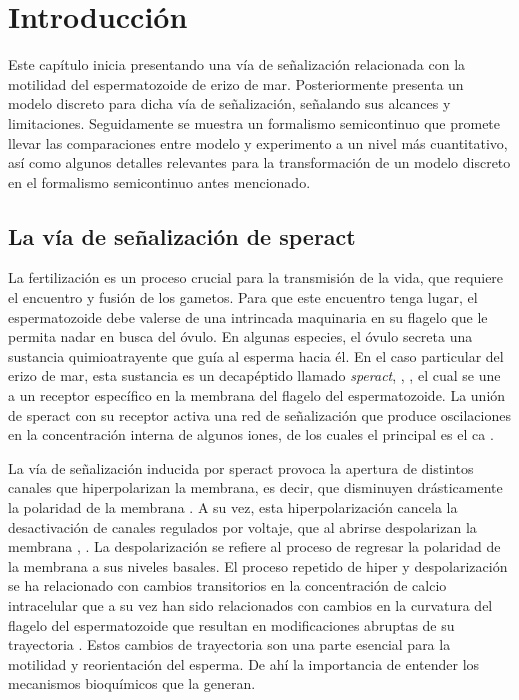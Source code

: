 \chapter{Introducci\'on}\label{ch:antecedentes}

Este capítulo inicia presentando una vía de señalización relacionada con la motilidad del espermatozoide de erizo de mar. Posteriormente presenta un modelo discreto para dicha vía de señalización, señalando sus alcances y limitaciones. Seguidamente se muestra un formalismo semicontinuo que promete llevar las comparaciones entre modelo y experimento a un nivel más cuantitativo, así como algunos detalles relevantes para la transformación de un modelo discreto en el formalismo semicontinuo antes mencionado.

\section{La v\'ia de se\~nalizaci\'on de speract}\label{sec:spSigNet}

La fertilización es un proceso crucial para la transmisión de la vida, que requiere el encuentro y fusión de los gametos. Para que este encuentro tenga lugar, el espermatozoide debe valerse de una intrincada maquinaria en su flagelo que le permita nadar en busca del óvulo. En algunas especies, el óvulo secreta una sustancia quimioatrayente que guía al esperma hacia él. En el caso particular del erizo de mar, esta sustancia es un decapéptido llamado \emph{speract}, \citeauthor{SUZUKI:1995gp} \citep{SUZUKI:1995gp}, \citeauthor{Hansbrough:1981vk} \citep{Hansbrough:1981vk}, el cual se une a un receptor específico en la membrana del flagelo del espermatozoide. La unión de speract con su receptor activa una red de señalización que produce oscilaciones en la concentración interna de algunos iones, de los cuales el principal es el \ac{ca} \citeauthor{Darszon2008} \citep{Darszon2008}. 

La vía de señalización inducida por speract provoca la apertura de distintos canales que hiperpolarizan la membrana, es decir, que disminuyen drásticamente la polaridad de la membrana \citeauthor{Kaupp:2008gv} \citep{Kaupp:2008gv}. A su vez, esta hiperpolarización cancela la desactivación de canales regulados por voltaje, que al abrirse despolarizan la membrana \citeauthor{Strunker:2006tk} \citep{Strunker:2006tk}, \citeauthor{GranadosGonzalez:2005ia} \citep{GranadosGonzalez:2005ia}. La despolarización se refiere al proceso de regresar la polaridad de la membrana a sus niveles basales. El proceso repetido de hiper y despolarización se ha relacionado con cambios transitorios en la concentración de calcio intracelular que a su vez han sido relacionados con cambios en la curvatura del flagelo del espermatozoide que resultan en modificaciones abruptas de su trayectoria \citeauthor{Darszon2008} \citep{Darszon2008}. Estos cambios de trayectoria son una parte esencial para la motilidad y reorientación del esperma. De ahí la importancia de entender los mecanismos bioquímicos que la generan. 

